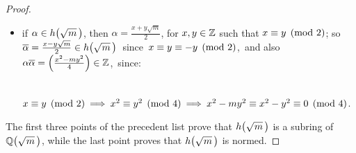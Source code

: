 \begin{proof}
\begin{itemize}
\item
if $\alpha \in \hh{m}$, then $\alpha = \frac{x + y \sqrt{m}}{2}$,
for $x,y \in \mathbb{Z}$ such that $x \equiv y \pmod 2$; so\,
$\cg{\alpha} = \frac{x - y \sqrt{m}}{2} \in \hh{m}$\, since\,
$x \equiv y \equiv -y \pmod 2$,\, and also\,
$\alpha \overline{\alpha} = \left(\frac{x^2 - my^2}{4}\right)\in \mathbb{Z}$,\, since:

~~$x \equiv y \pmod 2 \:\Longrightarrow\: x^2 \equiv y^2 \pmod 4 \:\Longrightarrow\:
x^2 - my^2 \equiv x^2 - y^2 \equiv 0 \pmod 4$.

\end{itemize}

The first three points of the precedent list prove that $\hh{m}$ is a
subring of $\QQ{m}$, while the last point proves that $\hh{m}$ is normed.
%
\end{proof}

